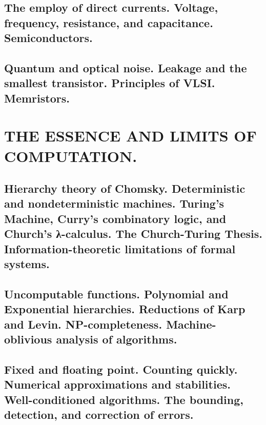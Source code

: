 \documentclass[letterpaper,draft]{memoir}
\begin{document}
\chapter{The employ of direct currents. Voltage, frequency, resistance, and capacitance. Semiconductors.}

\chapter{Quantum and optical noise. Leakage and the smallest transistor. Principles
of VLSI. Memristors.}


\part{THE ESSENCE AND LIMITS OF COMPUTATION.}


\chapter{Hierarchy theory of Chomsky. Deterministic and nondeterministic machines.
Turing's Machine, Curry's combinatory logic, and Church's \greektext λ\latintext-calculus. The
Church-Turing Thesis. Information-theoretic limitations of formal systems.}

\chapter{Uncomputable functions. Polynomial and Exponential hierarchies. Reductions
of Karp and Levin. NP-completeness. Machine-oblivious analysis of algorithms.}

\chapter{Fixed and floating point. Counting quickly. Numerical approximations and
stabilities. Well-conditioned algorithms. The bounding, detection, and
correction of errors.}
\end{document}

